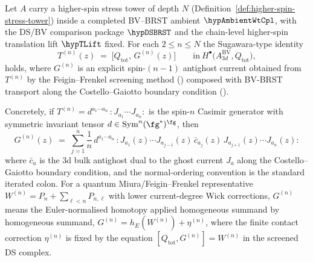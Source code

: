 \begin{theorem}
\label{thm:iterated-sugawara-construction}
Let $A$ carry a higher-spin stress tower of depth $N$
\textup{(}Definition~\textup{\ref{def:higher-spin-stress-tower}}\textup{)}
inside a completed BV--BRST ambient \(\hypAmbientWtCpl\), with the
DS/BV comparison package \(\hypDSBRST\) and the chain-level higher-spin
translation lift \(\hypTLift\) fixed.
For each $2 \le n \le N$ the Sugawara-type identity
\begin{equation}\label{eq:sugawara-n-explicit}
T^{(n)}(z) \;=\; \bigl[Q_{\mathrm{tot}},\, G^{(n)}(z)\bigr]
\qquad\text{in}\ H^\bullet\bigl(A^{\mathrm{BV}}_{3d}, Q_{\mathrm{tot}}\bigr),
\end{equation}
holds, where $G^{(n)}$ is an explicit spin-$(n{-}1)$ antighost current
obtained from $T^{(n)}$ by the Feigin--Frenkel screening method
\textup{(}\cite{Feigin-Frenkel-screenings}\textup{)} composed with
BV-BRST transport along the Costello--Gaiotto boundary condition
\textup{(}\cite{costello-gaiotto}\textup{)}.

Concretely, if $T^{(n)} = d^{a_1 \cdots a_n}\,{:}J_{a_1}\cdots
J_{a_n}{:}$ is the spin-$n$ Casimir generator with symmetric invariant
tensor $d \in \mathrm{Sym}^n(\fg^*)^\fg$, then
\begin{equation}\label{eq:G-n-formula}
G^{(n)}(z)
\;=\;
\sum_{j=1}^n
\frac{1}{n}\,
d^{a_1 \cdots a_n}\,
{:}J_{a_1}(z)\cdots J_{a_{j-1}}(z)\,
\bar c_{a_j}(z)\,J_{a_{j+1}}(z)\cdots J_{a_n}(z){:}
\end{equation}
where $\bar c_a$ is the $3$d bulk antighost dual to the ghost current
$J_a$ along the Costello--Gaiotto boundary condition, and the
normal-ordering convention is the standard iterated colon. For a
quantum Miura/Feigin--Frenkel representative
$W^{(n)}=P_n+\sum_{\ell<n}P_{n,\ell}$ with lower current-degree Wick
corrections, $G^{(n)}$ means the Euler-normalised homotopy applied
homogeneous summand by homogeneous summand,
$G^{(n)}=h_E(W^{(n)})+\eta^{(n)}$, where the finite contact correction
$\eta^{(n)}$ is fixed by the equation
$[Q_{\mathrm{tot}},G^{(n)}]=W^{(n)}$ in the screened DS complex.
\end{theorem}

